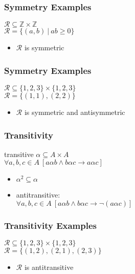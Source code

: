 \documentclass[dvipsnames]{beamer}
\begin{document}
\begin{frame}
  \frametitle{Symmetry Examples}

  $\mathcal{R} \subseteq \mathbb{Z} \times \mathbb{Z}$\\
  $\mathcal{R} = \{(a,b)~|~ab \geq 0\}$

  \medskip
  \begin{itemize}
    \item $\mathcal{R}$ is symmetric
  \end{itemize}
\end{frame}

\begin{frame}
  \frametitle{Symmetry Examples}

  $\mathcal{R} \subseteq \{1,2,3\} \times \{1,2,3\}$\\
  $\mathcal{R} = \{(1,1), (2,2)\}$

  \begin{itemize}
    \item $\mathcal{R}$ is symmetric and antisymmetric
  \end{itemize}
\end{frame}

\begin{frame}
  \frametitle{Transitivity}

  \begin{block}{transitive}
    $\alpha \subseteq A \times A$\\
    $\forall a,b,c \in A~[a \alpha b \wedge b \alpha c \rightarrow a \alpha c]$
  \end{block}

  \pause
  \begin{itemize}
    \item $\alpha^2 \subseteq \alpha$

    \pause
    \item antitransitive:\\
      $\forall a,b,c \in A~[a \alpha b \wedge b \alpha c \rightarrow \neg (a \alpha c)]$
  \end{itemize}
\end{frame}

\begin{frame}
  \frametitle{Transitivity Examples}

  $\mathcal{R} \subseteq \{1,2,3\} \times \{1,2,3\}$\\
  $\mathcal{R} = \{(1,2), (2,1), (2,3)\}$

  \medskip
  \begin{itemize}
    \item $\mathcal{R}$ is antitransitive
  \end{itemize}
\end{frame}
\end{document}

